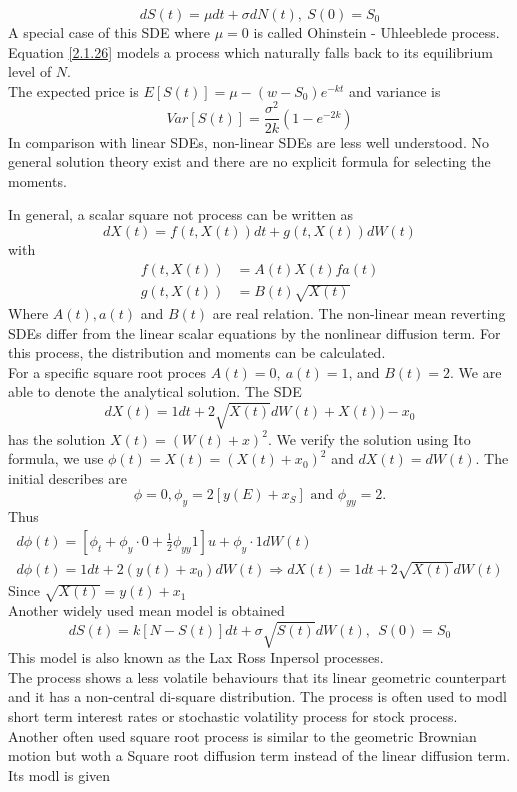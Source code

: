 \documentclass[a4 paper, 12pt]{report}
\theoremstyle{plain}
\begin{document}
\begin{equation}\label{2.1.26}
dS(t)  =\mu dt+\sigma dN(t),~S(0) = S_0
\end{equation}
A special case of this SDE where $\mu  = 0$ is called Ohinstein - Uhleeblede process. Equation \eqref{2.1.26} models a process which naturally falls back to its equilibrium level of $N$.\\
The expected price is $E[S(t)] = \mu - (w-S_0)e^{-kt}$ and variance is
$$
Var[S(t)] = \frac{\sigma^2}{2k}(1-e^{-2k})
$$
In comparison with linear SDEs, non-linear SDEs are less well understood. No general solution theory exist and there are no explicit formula for selecting the moments.\\
\par In general, a scalar square not process can be written as
$$
dX(t) = f(t,X(t))dt+g(t,X(t))dW(t)
$$
with
\begin{align*}
f(t,X(t))& = A(t)X(t)fa(t)\\
g(t,X(t))& = B(t)\sqrt{X(t)}
\end{align*}
Where $A(t), a(t)$ and $B(t)$ are real relation. The non-linear mean reverting SDEs differ from the linear scalar equations by the nonlinear diffusion term. For this process, the distribution and moments can be calculated.\\
For a specific square root proces $A(t) = 0,~a(t)  =1$, and $B(t) = 2$. We are able to denote the analytical solution. The SDE
$$
dX(t) = 1dt+2\sqrt{X(t)}dW(t)+X(t)) - x_0
$$
has the solution $X(t) = (W(t)+x)^2$. We verify the solution using Ito formula, we use $\phi(t) = X(t) = (X(t)+x_0)^2$ and $dX(t) = dW(t)$. The initial describes  are
$$
\phi = 0,\phi_y = 2[y(E)+x_S]\mbox{  and  }\phi_{yy} = 2.
$$ 
Thus
\begin{align*}
d\phi(t) = [\phi_t+\phi_y\cdot 0+\frac{1}{2}\phi_{yy}1]u+\phi_y\cdot 1dW(t)\\
d\phi(t) = 1dt +2(y(t)+x_0)dW(t)\Rightarrow dX(t) = 1dt+2\sqrt{X(t)}dW(t)
\end{align*}
Since $\sqrt{X(t)} = y(t)+x_1$\\
Another widely used mean model is obtained
\begin{equation}\label{2.1.27}
dS(t) = k[N - S(t)]dt+\sigma\sqrt{S(t)}dW(t),~~S(0) = S_0
\end{equation}
This model is also known as the Lax Ross Inpersol processes.\\
The process shows a less volatile behaviours that its linear geometric counterpart and it has a non-central di-square distribution. The process is often used to modl short term interest rates or stochastic volatility process for stock process. Another often used square root process is similar to the geometric Brownian motion but woth a Square root diffusion term instead of the linear diffusion term. Its modl is given
\end{document}
